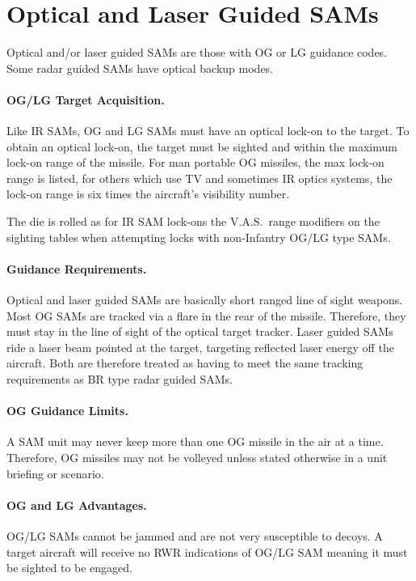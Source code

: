 \section{Optical and Laser Guided SAMs}

Optical and/or laser guided SAMs are those with OG or LG guidance codes. Some radar guided SAMs have optical back­up modes.

\paragraph{OG/LG Target Acquisition.} Like IR SAMs, OG and LG SAMs must have an optical lock-on to the target. To obtain an optical lock-on, the target must be sighted and within the maximum lock-on range of the missile. For man portable OG missiles, the max lock-on range is listed, for others which use TV and sometimes IR optics systems, the lock-on range is six times the aircraft's visibility number.

The die is rolled as for IR SAM lock-ons the V.A.S.\ range modifiers on the sighting tables when attempting locks with non-Infantry OG/LG type SAMs.

\paragraph{Guidance Requirements.} Optical and laser guided SAMs are basically short ranged line of sight weapons. Most OG SAMs are tracked via a flare in the rear of the missile. Therefore, they must stay in the line of sight of the optical target tracker. Laser guided SAMs ride a laser beam pointed at the target, targeting reflected laser energy off the aircraft. Both are therefore treated as having to meet the same tracking requirements as BR type radar guided SAMs.

\paragraph{OG Guidance Limits.} A SAM unit may never keep more than one OG missile in the air at a time. Therefore, OG missiles may not be volleyed unless stated otherwise in a unit briefing or scenario.

\paragraph{OG and LG Advantages.} OG/LG SAMs cannot be jammed and are not very susceptible to decoys. A target aircraft will receive no RWR indications of OG/LG SAM meaning it must be sighted to be engaged.

